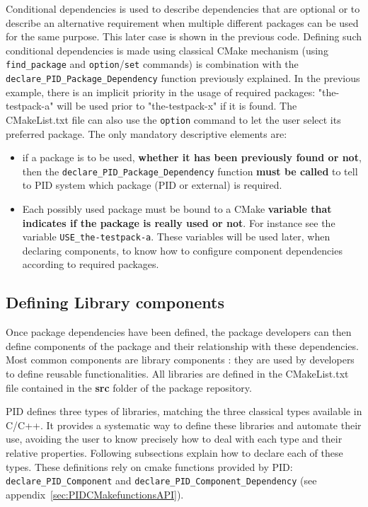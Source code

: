 \documentclass[12pt,a4paper]{article}
\begin{document}
Conditional dependencies is used to describe dependencies that are optional or to describe an alternative requirement when multiple different packages can be used for the same purpose. This later case is shown in the previous code. Defining such conditional dependencies is made using classical CMake mechanism (using \texttt{find\_package} and \texttt{option}/\texttt{set} commands) is combination with the \texttt{declare\_PID\_Package\_Dependency} function previously explained. In the previous example, there is an implicit priority in the usage of required packages: "the-testpack-a" will be used prior to "the-testpack-x" if it is found. The CMakeList.txt file can also use the \texttt{option} command to let the user select its preferred package. The only mandatory descriptive elements are:
\begin{itemize}
\item if a package is to be used, \textbf{whether it has been previously found or not}, then the \texttt{declare\_PID\_Package\_Dependency} function \textbf{must be called} to tell to PID system which package (PID or external) is required.
\item Each possibly used package must be bound to a CMake \textbf{variable that indicates if the package is really used or not}. For instance see the variable \texttt{USE\_the-testpack-a}. These variables will be used later, when declaring components, to know how to configure component dependencies according to required packages.
\end{itemize}

\subsection{Defining Library components}
\label{sec:libCMake}

Once package dependencies have been defined, the package developers can then define components of the package and their relationship with these dependencies. Most common components are library components : they are used by developers to define reusable functionalities. All libraries are defined in the CMakeList.txt file contained in the \textbf{src} folder of the package repository.

PID defines three types of libraries, matching the three classical  types available in C/C++. It provides a systematic way to define these libraries and automate their use, avoiding the user to know precisely how to deal with each type and their relative properties. Following subsections explain how to declare each of these types. These definitions rely on cmake functions provided by PID: \texttt{declare\_PID\_Component} and \texttt{declare\_PID\_Component\_Dependency} (see appendix~\ref{sec:PIDCMakefunctionsAPI}).
\end{document}
